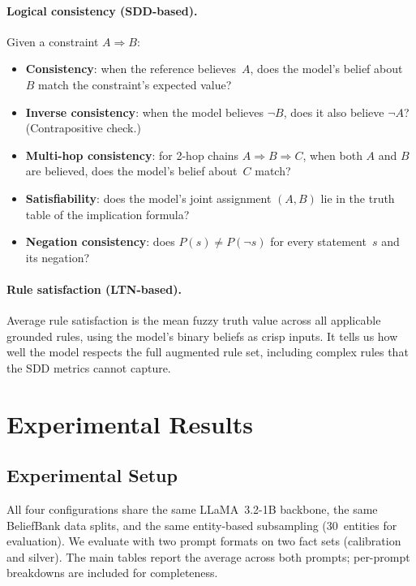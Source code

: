 \documentclass[11pt,a4paper]{article}
\begin{document}
\paragraph{Logical consistency (SDD-based).}
Given a constraint $A \Rightarrow B$:
\begin{itemize}[nosep]
  \item \textbf{Consistency}: when the reference believes~$A$, does the
    model's belief about~$B$ match the constraint's expected value?
  \item \textbf{Inverse consistency}: when the model believes $\lnot B$,
    does it also believe $\lnot A$?  (Contrapositive check.)
  \item \textbf{Multi-hop consistency}: for 2-hop chains
    $A \Rightarrow B \Rightarrow C$, when both $A$ and $B$ are believed,
    does the model's belief about~$C$ match?
  \item \textbf{Satisfiability}: does the model's joint assignment
    $(A, B)$ lie in the truth table of the implication formula?
  \item \textbf{Negation consistency}: does $P(s) \neq P(\lnot s)$
    for every statement~$s$ and its negation?
\end{itemize}

\paragraph{Rule satisfaction (LTN-based).}
Average rule satisfaction is the mean fuzzy truth value across all
applicable grounded rules, using the model's binary beliefs as crisp
inputs.  It tells us how well the model respects the full augmented rule
set, including complex rules that the SDD metrics cannot capture.

\section{Experimental Results}

\subsection{Experimental Setup}

All four configurations share the same LLaMA~3.2-1B backbone, the same
BeliefBank data splits, and the same entity-based subsampling (30~entities
for evaluation).  We evaluate with two prompt formats on two fact sets
(calibration and silver).  The main tables report the average across both
prompts; per-prompt breakdowns are included for completeness.
\end{document}
